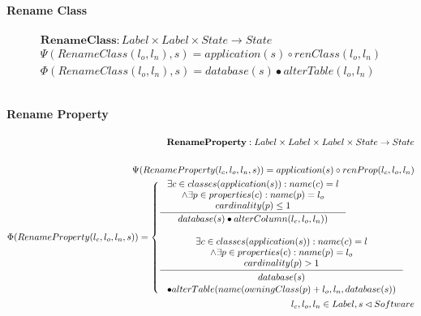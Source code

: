 \documentclass[11pt]{article}
\begin{document}
\paragraph{Rename Class}
\begin{align*}
\mathbf{RenameClass} : Label \times Label \times State \rightarrow State \\ 
\Psi(RenameClass(l_o, l_n), s) = application(s) \circ renClass(l_o, l_n) \\
\Phi(RenameClass(l_o, l_n), s) = database(s) \bullet alterTable(l_o, l_n) \\ \\
\end{align*}

\paragraph{Rename Property}
\begin{align*}
	\mathbf{RenameProperty} : Label \times Label \times Label \times State \rightarrow State \\ \\
\Psi(RenameProperty(l_c, l_o, l_n, s)) = application(s) \circ renProp(l_c, l_o, l_n) \\
\Phi(RenameProperty(l_c, l_o, l_n, s)) = \begin{cases}
 	\inference{\exists c \in classes(application(s)) : name(c) = l\\ 
		\wedge \exists p \in properties(c) : name(p) = l_o \\
 	cardinality(p) \leq 1}{database(s) \bullet alterColumn(l_c, l_o, l_n))} \\\\
 	\inference{\exists c \in classes(application(s)) : name(c) = l\\ 
		\wedge \exists p \in properties(c) : name(p) = l_o \\
 	cardinality(p) > 1}{\begin{gathered}
		database(s)\\ \bullet alterTable(name(owningClass(p)+l_o, l_n, database(s))
\end{gathered}}
 \end{cases}\\
l_c, l_o, l_n \in Label,  s \lhd Software
\end{align*}
\end{document}
